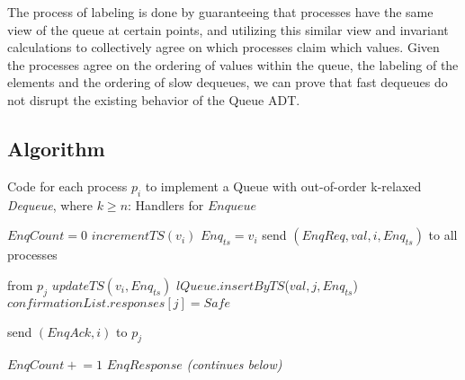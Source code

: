 \documentclass[a4paper,anonymous,USenglish]{lipics-v2021} %
\theoremstyle{definition}
\newcommand{\red}[1]{\textcolor{red}{#1}} %
\newcommand{\pluseq}{\mathrel{+}=}
\begin{document}
The process of labeling is done by guaranteeing that processes have the same view of the queue at certain points, and utilizing this similar view and invariant calculations to collectively agree on which processes claim which values. Given the processes agree on the ordering of values within the queue, the labeling of the elements and the ordering of slow dequeues, we can prove that fast dequeues do not disrupt the existing behavior of the Queue ADT. 
\subsection{Algorithm}

\begin{algorithm}
  \caption{Code for each process $p_i$ to implement a Queue with out-of-order k-relaxed \textit{Dequeue}, where $k \geq n$: Handlers for $Enqueue$}\label{alg:relaxed}
  \begin{algorithmic}[1]
    \Statex \Comment{\red{Is this entirely the same as for unrelaxed queues? I know I said to keep it, but I'm second-guessing whether we should include it if it's in a separate algorithm block and completely unchanged.}
}
      \State $EnqCount = 0$
      \State $incrementTS(v_i)$
      \State $Enq_{ts} = v_i$
      \State send $(EnqReq, val, i, Enq_{ts})$ to all processes
    \EndFunction

     from $p_j$
      \State $updateTS(v_i, Enq_{ts})$
      \State $lQueue.insertByTS$($val, j, Enq_{ts}$)
          \State $confirmationList.responses[j] = Safe$
        \EndIf
      \EndFor

      \State send $(EnqAck, i)$ to $p_j$
    \EndFunction

      \State $EnqCount \pluseq 1$
        \Return $EnqResponse$
      \EndIf
    \EndFunction
    \Statex
    \Statex \emph{(continues below)}
  \end{algorithmic}
\end{algorithm}
\end{document}
